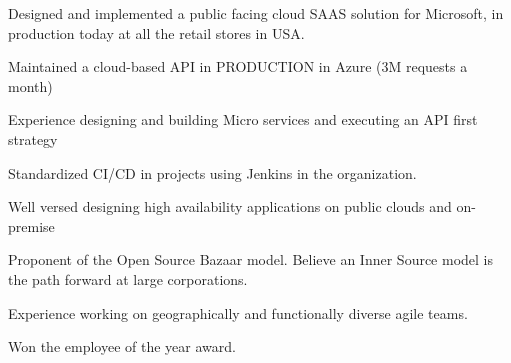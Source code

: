 

\begin{cventries}

  \cvhighlights
    {
      \begin{cvitems} %
        \item {Designed and implemented a public facing cloud SAAS solution for Microsoft, in production today at all the retail stores in USA.}
        \item {Maintained a cloud-based API in PRODUCTION in Azure (3M requests a month)}
        \item {Experience designing and building Micro services and executing an API first strategy}
        \item {Standardized CI/CD in projects using Jenkins in the organization.}
        \item {Well versed designing high availability applications on public clouds and on-premise}
        \item {Proponent of the Open Source Bazaar model. Believe an Inner Source model is the path forward at large corporations.}
        \item {Experience working on geographically and functionally diverse agile teams.}
        \item {Won the employee of the year award.}
      \end{cvitems}
    }
    

\end{cventries}
